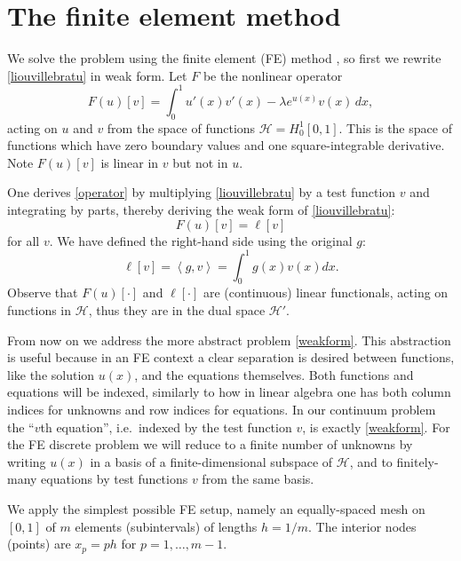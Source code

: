\documentclass[letterpaper,final,12pt,reqno]{amsart}
\newcommand{\ip}[2]{\left<#1,#2\right>}
\begin{document}
\section{The finite element method}  \label{sec:femethod}

We solve the problem using the finite element (FE) method \cite{Bueler2021,Elmanetal2014}, so first we rewrite \eqref{liouvillebratu} in weak form.  Let $F$ be the nonlinear operator
\begin{equation}
  F(u)[v] = \int_0^1 u'(x) v'(x) - \lambda e^{u(x)} v(x)\, dx,  \label{operator}
\end{equation}
acting on $u$ and $v$ from the space of functions $\mathcal{H}=H_0^1[0,1]$.  This is the space of functions which have zero boundary values and one square-integrable derivative.  Note $F(u)[v]$ is linear in $v$ but not in $u$.

One derives \eqref{operator} by multiplying \eqref{liouvillebratu} by a test function $v$ and integrating by parts, thereby deriving the weak form of \eqref{liouvillebratu}:
\begin{equation}
  F(u)[v] = \ell[v] \label{weakform}
\end{equation}
for all $v$.  We have defined the right-hand side using the original $g$:
\begin{equation}
  \ell[v] = \ip{g}{v} = \int_0^1 g(x) v(x) dx.  \label{rhsfunctional}
\end{equation}
Observe that $F(u)[\cdot]$ and $\ell[\cdot]$ are (continuous) linear functionals, acting on functions in $\mathcal{H}$, thus they are in the dual space $\mathcal{H}'$.

From now on we address the more abstract problem \eqref{weakform}.  This abstraction is useful because in an FE context a clear separation is desired between functions, like the solution $u(x)$, and the equations themselves.  Both functions and equations will be indexed, similarly to how in linear algebra one has both column indices for unknowns and row indices for equations.  In our continuum problem the ``$v$th equation'', i.e.~indexed by the test function $v$, is exactly \eqref{weakform}.  For the FE discrete problem we will reduce to a finite number of unknowns by writing $u(x)$ in a basis of a finite-dimensional subspace of $\mathcal{H}$, and to finitely-many equations by test functions $v$ from the same basis.

We apply the simplest possible FE setup, namely an equally-spaced mesh on $[0,1]$ of $m$ elements (subintervals) of lengths $h=1/m$.  The interior nodes (points) are $x_p=ph$ for $p=1,\dots,m-1$.
\end{document}
